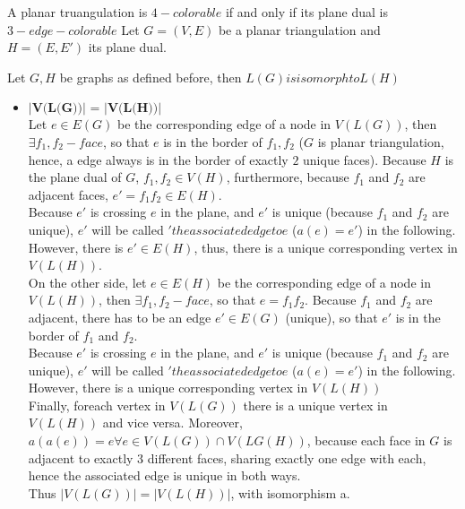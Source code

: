 \documentclass[a4paper]{article}
\begin{document}
		\begin{solution}{30}
			\begin{theorem}{A planar truangulation is $4-colorable$ if and only if its plane dual is $3-edge-colorable$}
				Let $G=(V,E)$ be a planar triangulation and $H=(E,E')$ its plane dual.\\
			
				\begin{mylemma} {Let $G,H$ be graphs as defined before, then $L(G) is isomorph to L(H)$}
					\\
					\begin{itemize}
						\item $\textbf{|V(L(G))| = |V(L(H))|}$\\
							Let $e \in E(G)$ be the corresponding edge of a node in $V(L(G))$, then $\exists f_1,f_2 - face$, so that $e$ is in the border of $f_1, f_2$ ($G$ is planar triangulation, hence, a edge always is in the border of exactly $2$ unique faces). Because $H$ is the plane dual of $G$, $f_1,f_2 \in V(H)$, furthermore, because $f_1$ and $f_2$ are adjacent faces, $e'=f_1f_2 \in E(H)$.\\
							Because $e'$ is crossing $e$ in the plane, and $e'$ is unique (because $f_1$ and $f_2$ are unique), $e'$ will be called $'the associated edge to e$ ($a(e)=e'$) in the following.\\
							However, there is $e' \in E(H)$, thus, there is a unique corresponding vertex in $V(L(H))$.\\
							
							On the other side, let $e \in E(H)$ be the corresponding edge of a node in $V(L(H))$, then $\exists f_1, f_2 - face$, so that $e=f_1 f_2$. Because $f_1$ and $f_2$ are adjacent, there has to be an edge $e' \in E(G)$ (unique), so that $e'$ is in the border of $f_1$ and $f_2$.\\
							Because $e'$ is crossing $e$ in the plane, and $e'$ is unique (because $f_1$ and $f_2$ are unique), $e'$ will be called $'the associated edge to e$ ($a(e)=e'$) in the following.\\
							However, there is a unique corresponding vertex in $V(L(H))$\\
							
							Finally, foreach vertex in $V(L(G))$ there  is a unique vertex in $V(L(H))$ and vice versa. Moreover, $a(a(e)) = e \forall e \in V(L(G)) \cap V(LG(H))$, because each face in $G$ is adjacent to exactly 3 different faces, sharing exactly one edge with each, hence the associated edge is unique in both ways.\\
							Thus $|V(L(G))| = |V(L(H))|$, with isomorphism a.
							 

\end{itemize}
\end{mylemma}
\end{theorem}
\end{solution}
\end{document}
